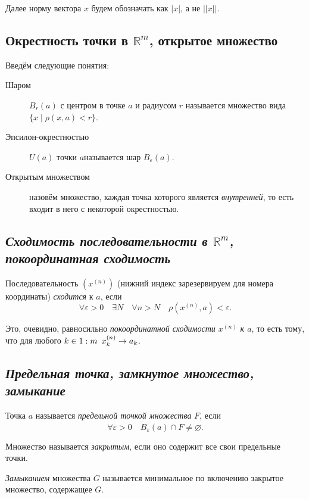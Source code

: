 \begin{remark}
	Далее норму вектора \(x\) будем обозначать как  \(|x|\), а не \(||x||\).
\end{remark}

\subsection{Окрестность точки в \(\mathbb{R}^m\), открытое множество}

\begin{definition}
	Введём следующие понятия:
	\begin{description}
		\item[Шаром] \(B_r (a)\) с центром в точке \(a\) и радиусом \(r\) называется множество вида \(\{x \mid \rho(x, a) < r\}\).
		\item[Эпсилон-окрестностью] \(U(a)\) точки \(a\)называется шар \(B_\varepsilon (a)\).
		\item[Открытым множеством] назовём множество, каждая точка которого является \textit{внутренней}, то есть входит в него с некоторой окрестностью.
	\end{description}
\end{definition}

\subsection{\itshape Сходимость последовательности в \(\mathbb{R}^m\), покоординатная сходимость}

\begin{definition}
	Последовательность  \((x^{(n)})\) (нижний индекс зарезервируем для номера координаты) \textit{сходится} к \(a\), если \[
		\forall \varepsilon > 0 \quad \exists N \quad \forall n > N \quad \rho(x^{(n)}, a) < \varepsilon.
	\]
	
	Это, очевидно, равносильно \textit{покоординатной сходимости \(x^{(n)}\) к \(a\)}, то есть тому, что для любого \(k \in 1 : m \enskip x_k^{(n)} \to a_k\).
\end{definition}

\subsection{\itshape Предельная точка, замкнутое множество, замыкание}

\begin{definition}
	Точка  \(a\) называется \textit{предельной точкой множества} \(F\), если \[
		\forall \varepsilon > 0 \quad \dot B_\varepsilon (a) \cap F \neq \varnothing.
	\]
	
	Множество называется \textit{закрытым}, если оно содержит все свои предельные точки.
	
	\textit{Замыканием} множества \(G\) называется минимальное по включению закрытое множество, содержащее \(G\).
\end{definition}

